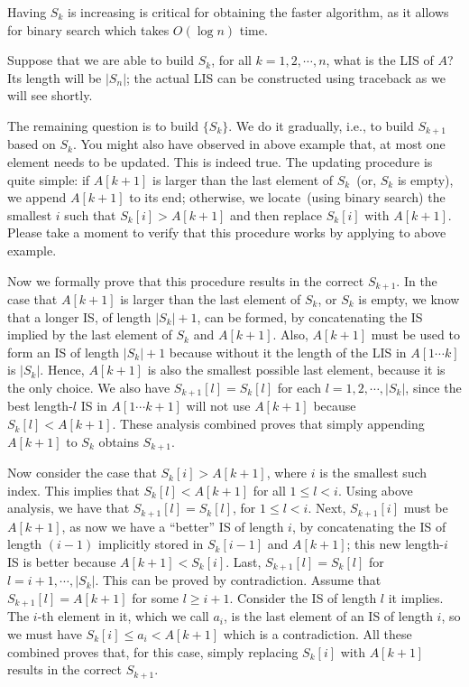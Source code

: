 Having $S_k$ is increasing is critical for obtaining the faster algorithm,
as it allows for binary search which takes $O(\log n)$ time. 

Suppose that we are able to build $S_k$, for all $k = 1, 2, \cdots, n$,
what is the LIS of $A$? Its length will be $|S_n|$; 
the actual LIS can be constructed using traceback as we will see shortly.

The remaining question is to build $\{S_k\}$. We do it gradually,
i.e., to build $S_{k+1}$ based on $S_k$.
You might also have observed in above example that, at most one element
needs to be updated. This is indeed true.
The updating procedure is quite simple: if $A[k+1]$ is larger than the last element of $S_k$~(or, $S_k$ is empty),
we append $A[k+1]$ to its end; otherwise, we locate~(using binary search) the smallest $i$
such that $S_k[i] > A[k+1]$ and then replace $S_k[i]$ with $A[k+1]$.
Please take a moment to verify that this procedure works by applying to above example.

Now we formally prove that this procedure results in the correct $S_{k+1}$.
In the case that $A[k+1]$ is larger than the last element of $S_k$, or $S_k$ is empty,
we know that a longer IS, of length $|S_k| + 1$, can be formed, by concatenating
the IS implied by the last element of $S_k$ and $A[k+1]$.
Also, $A[k+1]$ must be used to form an IS of length $|S_k| + 1$ because
without it the length of the LIS in $A[1\cdots k]$ is $|S_k|$. Hence, $A[k+1]$ is
also the smallest possible last element, because it is the only choice.
We also have $S_{k+1}[l] = S_k[l]$ for each $l = 1, 2, \cdots, |S_k|$, since
the best length-$l$ IS in $A[1\cdots k+1]$ will not use $A[k+1]$ because $S_k[l] < A[k+1]$.
These analysis combined proves that simply appending $A[k+1]$ to $S_k$ obtains $S_{k+1}$.

Now consider the case that $S_k[i] > A[k+1]$, where $i$ is the smallest such index.
This implies that $S_k[l] < A[k+1]$ for all $1 \le l < i$.
Using above analysis, we have that $S_{k+1}[l] = S_k[l]$, for $1 \le l < i$.
Next, $S_{k+1}[i]$ must be $A[k+1]$,
as now we have a ``better'' IS of length $i$,
by concatenating the IS of length $(i-1)$ implicitly stored in $S_k[i-1]$ and $A[k+1]$; 
this new length-$i$ IS is better because $A[k+1] < S_k[i]$.
Last, $S_{k+1}[l] = S_k[l]$ for $l = i + 1, \cdots, |S_k|$.
This can be proved by contradiction.
Assume that $S_{k+1}[l] = A[k+1]$ for some $l \ge i + 1$. 
Consider the IS of length $l$ it implies.
The $i$-th element in it, which we call $a_i$, is the last element of an IS of length $i$,
so we must have $S_k[i] \le a_i < A[k+1]$ which is a contradiction.
All these combined proves that, for this case, simply replacing $S_k[i]$ with $A[k+1]$ results in the correct $S_{k+1}$.

